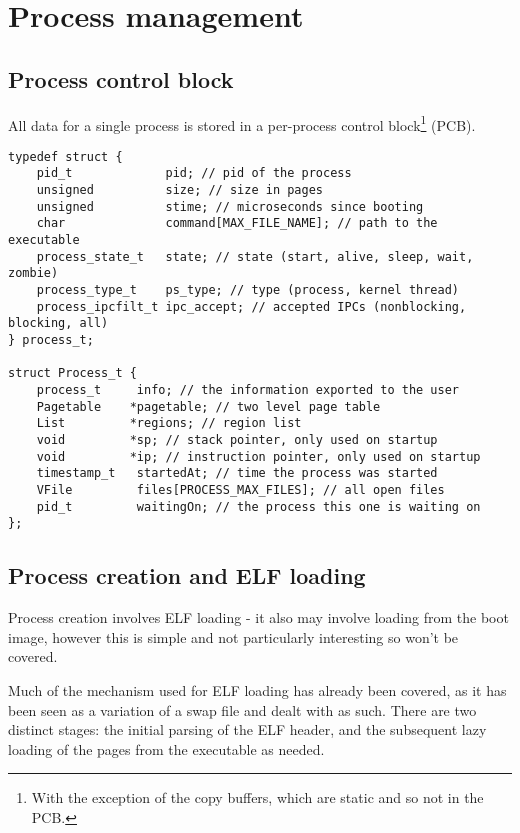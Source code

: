 \documentclass[12pt,english]{article}
\begin{document}

\section{Process management}

\subsection{Process control block}

All data for a single process is stored in a per-process control block\footnote{With the exception of the copy buffers, which are static and so not in the PCB.} (PCB).

\begin{verbatim}
typedef struct {
    pid_t             pid; // pid of the process
    unsigned          size; // size in pages
    unsigned          stime; // microseconds since booting
    char              command[MAX_FILE_NAME]; // path to the executable
    process_state_t   state; // state (start, alive, sleep, wait, zombie)
    process_type_t    ps_type; // type (process, kernel thread)
    process_ipcfilt_t ipc_accept; // accepted IPCs (nonblocking, blocking, all)
} process_t;

struct Process_t {
    process_t     info; // the information exported to the user
    Pagetable    *pagetable; // two level page table
    List         *regions; // region list
    void         *sp; // stack pointer, only used on startup
    void         *ip; // instruction pointer, only used on startup
    timestamp_t   startedAt; // time the process was started
    VFile         files[PROCESS_MAX_FILES]; // all open files
    pid_t         waitingOn; // the process this one is waiting on
};
\end{verbatim}

\subsection{Process creation and ELF loading} \label{sub:elf_loading}

Process creation involves ELF loading - it also may involve loading from the boot image, however this is simple and not particularly interesting so won't be covered.

Much of the mechanism used for ELF loading has already been covered, as it has been seen as a variation of a swap file and dealt with as such.  There are two distinct stages: the initial parsing of the ELF header, and the subsequent lazy loading of the pages from the executable as needed.
\end{document}
